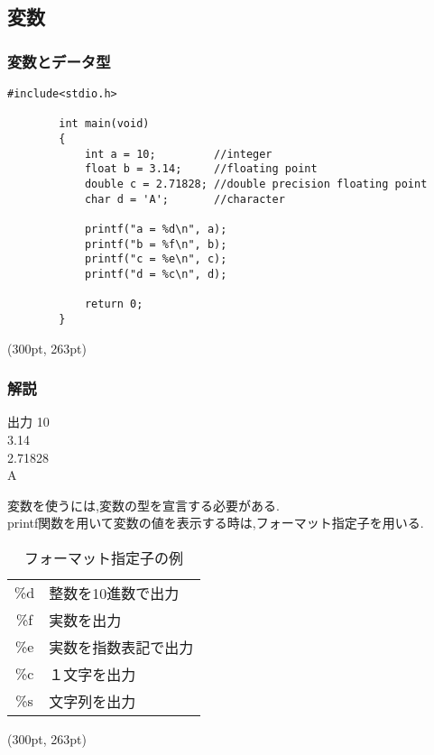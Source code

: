 \documentclass[dvipdfmx]{beamer}
\begin{document}
\subsection{変数}
\begin{frame}[t, fragile, label=13]
    \frametitle{変数とデータ型}
    \begin{lstlisting}[gobble=8, caption=variable.c, label=variable]
        #include<stdio.h>

        int main(void)
        {
            int a = 10;         //integer 
            float b = 3.14;     //floating point 
            double c = 2.71828; //double precision floating point
            char d = 'A';       //character 

            printf("a = %d\n", a);
            printf("b = %f\n", b);
            printf("c = %e\n", c);
            printf("d = %c\n", d);

            return 0;
        }
    \end{lstlisting}
    \begin{textblock*}{0.3\linewidth}(300pt, 263pt)
    \hyperlink{12}{}
    \space
    \hyperlink{14}{}
    \end{textblock*}
\end{frame}

\begin{frame}[t, fragile, label=14]
    \frametitle{解説}
    \begin{block}{出力}
    10\\
    3.14\\
    2.71828\\
    A
    \end{block}
    変数を使うには,変数の型を宣言する必要がある.\\
    printf関数を用いて変数の値を表示する時は,フォーマット指定子を用いる.
    \begin{table}[h]
        \caption{フォーマット指定子の例}
        \label{format}
        \centering
        \vspace{-5pt}
        \begin{tabular}{cl}
            \hline
            \%d & 整数を10進数で出力\\
            \%f & 実数を出力\\
            \%e & 実数を指数表記で出力\\
            \%c & １文字を出力\\
            \%s & 文字列を出力\\
            \hline
        \end{tabular}
    \end{table}
    \begin{textblock*}{0.3\linewidth}(300pt, 263pt)
    \hyperlink{13}{}
    \space
    \hyperlink{15}{}
    \end{textblock*}
\end{frame}
\end{document}
